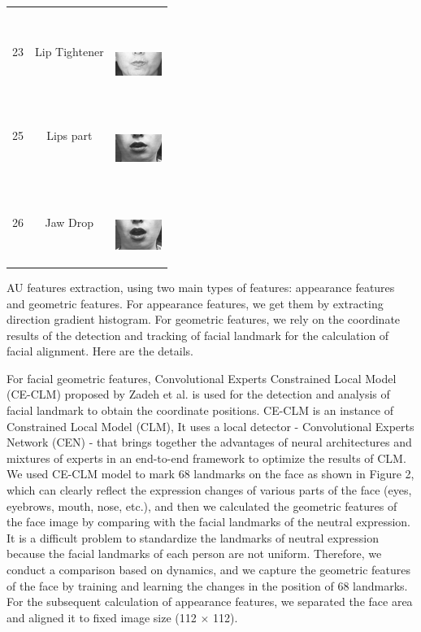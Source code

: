 \documentclass[10pt, conference, compsocconf]{IEEEtran}
\begin{document}
\begin{table}
\begin{tabular}{ccl}
\begin{minipage} {0.1\textwidth}
		\end{minipage}\\
		23 & Lip Tightener & \ \ \ \begin{minipage} {0.1\textwidth}
			\includegraphics[width=0.6in]{AUimage/AU23.png}
		\end{minipage}\\
		25 & Lips part & \ \ \ \begin{minipage} {0.1\textwidth}
			\includegraphics[width=0.6in]{AUimage/AU25.png}
		\end{minipage}\\
		26 & Jaw Drop & \ \ \ \begin{minipage} {0.1\textwidth}
			\includegraphics[width=0.6in]{AUimage/AU26.png}
		\end{minipage}\\
		\bottomrule
	\end{tabular}
\end{table}
AU features extraction, using two main types of features: appearance features and geometric features. For appearance features, we get them by extracting direction gradient histogram. For geometric features, we rely on the coordinate results of the detection and tracking of facial landmark for the calculation of facial alignment. Here are the details.

For facial geometric features, Convolutional Experts Constrained Local Model (CE-CLM) proposed by Zadeh\cite{zadeh2017convolutional} et al. is used for the detection and analysis of facial landmark to obtain the coordinate positions. CE-CLM is an instance of Constrained Local Model (CLM)\cite{Cristinacce2006Feature}, It uses a local detector - Convolutional Experts Network (CEN) - that brings together the advantages of neural architectures and mixtures of experts in an end-to-end framework to optimize the results of CLM. We used CE-CLM model to mark 68 landmarks on the face as shown in Figure 2, which can clearly reflect the expression changes of various parts of the face (eyes, eyebrows, mouth, nose, etc.), and then we calculated the geometric features of the face image by comparing with the facial landmarks of the neutral expression. It is a difficult problem to standardize the landmarks of neutral expression because the facial landmarks of each person are not uniform. Therefore, we conduct a comparison based on dynamics, and we capture the geometric features of the face by training and learning the changes in the position of 68 landmarks. For the subsequent calculation of appearance features, we separated the face area and aligned it to fixed image size (112 $\times$ 112).
\end{document}
